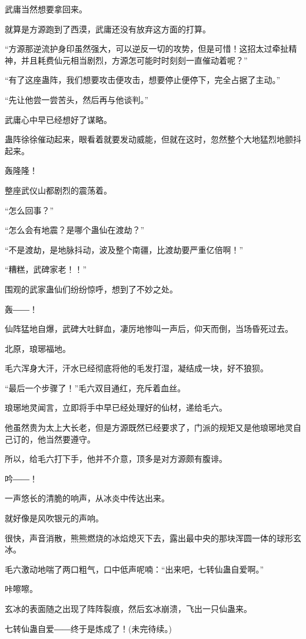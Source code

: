 \begin{this_body}
武庸当然想要拿回来。

就算是方源跑到了西漠，武庸还没有放弃这方面的打算。

“方源那逆流护身印虽然强大，可以逆反一切的攻势，但是可惜！这招太过牵扯精神，并且耗费仙元相当剧烈，方源怎可能时时刻刻一直催动着呢？”

“有了这座蛊阵，我们想要攻击便攻击，想要停止便停下，完全占据了主动。”

“先让他尝一尝苦头，然后再与他谈判。”

武庸心中早已经想好了谋略。

蛊阵徐徐催动起来，眼看着就要发动威能，但就在这时，忽然整个大地猛烈地颤抖起来。

轰隆隆！

整座武仪山都剧烈的震荡着。

“怎么回事？”

“怎么会有地震？是哪个蛊仙在渡劫？”

“不是渡劫，是地脉抖动，波及整个南疆，比渡劫要严重亿倍啊！”

“糟糕，武碑家老！！”

围观的武家蛊仙们纷纷惊呼，想到了不妙之处。

轰――！

仙阵猛地自爆，武碑大吐鲜血，凄厉地惨叫一声后，仰天而倒，当场昏死过去。

北原，琅琊福地。

毛六浑身大汗，汗水已经彻底将他的毛发打湿，凝结成一块，好不狼狈。

“最后一个步骤了！”毛六双目通红，充斥着血丝。

琅琊地灵闻言，立即将手中早已经处理好的仙材，递给毛六。

他虽然贵为太上大长老，但是方源既然已经要求了，门派的规矩又是他琅琊地灵自己订的，他当然要遵守。

所以，给毛六打下手，他并不介意，顶多是对方源颇有腹诽。

吟――！

一声悠长的清脆的响声，从冰炎中传达出来。

就好像是风吹银元的声响。

很快，声音消散，熊熊燃烧的冰焰熄灭下去，露出最中央的那块浑圆一体的球形玄冰。

毛六激动地喘了两口粗气，口中低声呢喃：“出来吧，七转仙蛊自爱啊。”

咔嚓嚓。

玄冰的表面随之出现了阵阵裂痕，然后玄冰崩溃，飞出一只仙蛊来。

七转仙蛊自爱――终于是炼成了！(未完待续。)

\end{this_body}

